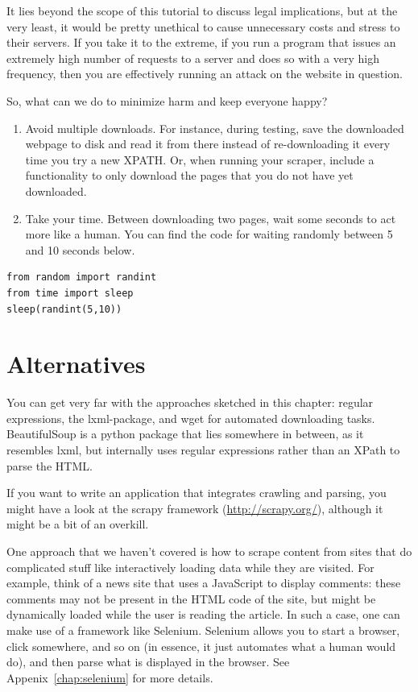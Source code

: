 \documentclass[a4paper,12pt]{book}
\begin{document}
It lies beyond the scope of this tutorial to discuss legal implications, but at the very least, it would be pretty unethical to cause unnecessary costs and stress to their servers. If you take it to the extreme, if you run a program that issues an extremely high number of requests to a server and does so with a very high frequency, then you are effectively running an attack on the website in question.

So, what can we do to minimize harm and keep everyone happy?

\begin{enumerate}
	\item Avoid multiple downloads. For instance, during testing, save the downloaded webpage to disk and read it from there instead of re-downloading it every time you try a new XPATH. Or, when running your scraper, include a functionality to only download the pages that you do not have yet downloaded.
	
	\item Take your time. Between downloading two pages, wait some seconds to act more like a human. You can find the code for waiting randomly between 5 and 10 seconds below. 
\end{enumerate}

\begin{lstlisting}
from random import randint
from time import sleep
sleep(randint(5,10))
\end{lstlisting}


\section{Alternatives}
You can get very far with the approaches sketched in this chapter: regular expressions, the lxml-package, and wget for automated downloading tasks. BeautifulSoup is a python package that lies somewhere in between, as it resembles lxml, but internally uses regular expressions rather than an XPath to parse the HTML.

If you want to write an application that integrates crawling and parsing, you might have a look at the scrapy framework (\url{http://scrapy.org/}), although it might be a bit of an overkill.

One approach that we haven't covered is how to scrape content from sites that do complicated stuff like interactively loading data while they are visited. For example, think of a news site that uses a JavaScript to display comments: these comments may not be present in the HTML code of the site, but might be dynamically loaded while the user is reading the article. In such a case, one can make use of a framework like Selenium. Selenium allows you to start a browser, click somewhere, and so on (in essence, it just automates what a human would do), and then parse what is displayed in the browser. See Appenix~\ref{chap:selenium} for more details.
\end{document}
